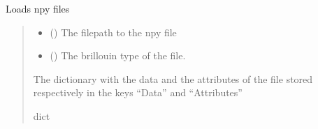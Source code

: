 \documentclass[letterpaper,10pt,english]{sphinxmanual}
\begin{document}

\begin{fulllineitems}
\label{\detokenize{_autosummary/HDF5_BLS.load_data:HDF5_BLS.load_data.load_npy_file}}
\pysigstartsignatures
\pysiglinewithargsret
{}
{\sphinxparamcomma {}}
{}
\pysigstopsignatures
\sphinxAtStartPar
Loads npy files
\begin{quote}\begin{description}
\begin{itemize}
\item {} 
\sphinxAtStartPar
{} () \textendash{} The filepath to the npy file

\item {} 
\sphinxAtStartPar
{} (\sphinxstyleliteralemphasis{\sphinxupquote{, }}) \textendash{} The brillouin type of the file.

\end{itemize}

\sphinxAtStartPar
The dictionary with the data and the attributes of the file stored respectively in the keys “Data” and “Attributes”

\sphinxAtStartPar
dict

\end{description}\end{quote}

\end{fulllineitems}

\end{document}
